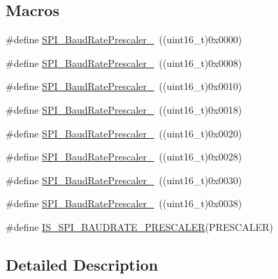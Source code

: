 \subsection*{Macros}
\begin{DoxyCompactItemize}
\item 
\#define \hyperlink{group___s_p_i___baud_rate___prescaler_ga88cd6d416c87b382396dbf4c02e3bd4b}{S\+P\+I\+\_\+\+Baud\+Rate\+Prescaler\+\_}~((uint16\+\_\+t)0x0000)
\item 
\#define \hyperlink{group___s_p_i___baud_rate___prescaler_ga17ac4858cb9387289ee7c3d94a9b54be}{S\+P\+I\+\_\+\+Baud\+Rate\+Prescaler\+\_}~((uint16\+\_\+t)0x0008)
\item 
\#define \hyperlink{group___s_p_i___baud_rate___prescaler_ga023a1e4c04586f2feb0d4b03b2e0c230}{S\+P\+I\+\_\+\+Baud\+Rate\+Prescaler\+\_}~((uint16\+\_\+t)0x0010)
\item 
\#define \hyperlink{group___s_p_i___baud_rate___prescaler_ga5ef8587bb96e3ec98e9fde770756fc7d}{S\+P\+I\+\_\+\+Baud\+Rate\+Prescaler\+\_}~((uint16\+\_\+t)0x0018)
\item 
\#define \hyperlink{group___s_p_i___baud_rate___prescaler_ga1d30cecaa412cee5250c69644207c652}{S\+P\+I\+\_\+\+Baud\+Rate\+Prescaler\+\_}~((uint16\+\_\+t)0x0020)
\item 
\#define \hyperlink{group___s_p_i___baud_rate___prescaler_ga2c9cd96ed56432a83f8e4f46fbecb5e6}{S\+P\+I\+\_\+\+Baud\+Rate\+Prescaler\+\_}~((uint16\+\_\+t)0x0028)
\item 
\#define \hyperlink{group___s_p_i___baud_rate___prescaler_gafa6c39c3ee16a08730356a5cd30f3648}{S\+P\+I\+\_\+\+Baud\+Rate\+Prescaler\+\_}~((uint16\+\_\+t)0x0030)
\item 
\#define \hyperlink{group___s_p_i___baud_rate___prescaler_ga1e1aa6406f0e88ac557ba49fb8069e3e}{S\+P\+I\+\_\+\+Baud\+Rate\+Prescaler\+\_}~((uint16\+\_\+t)0x0038)
\item 
\#define \hyperlink{group___s_p_i___baud_rate___prescaler_gae79f46ed9f91e39dc1f6912cb25fc716}{I\+S\+\_\+\+S\+P\+I\+\_\+\+B\+A\+U\+D\+R\+A\+T\+E\+\_\+\+P\+R\+E\+S\+C\+A\+L\+ER}(P\+R\+E\+S\+C\+A\+L\+ER)
\end{DoxyCompactItemize}


\subsection{Detailed Description}


